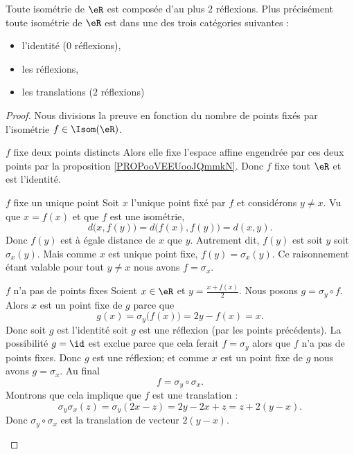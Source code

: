 \begin{theorem}
    Toute isométrie de \( \eR\) est composée d'au plus \( 2\) réflexions. Plus précisément toute isométrie de \( \eR\) est dans une des trois catégories suivantes :
    \begin{itemize}
        \item l'identité (\( 0\) réflexions),
        \item les réflexions,
        \item les translations (\( 2\) réflexions)
    \end{itemize}
\end{theorem}

\begin{proof}
    Nous divisions la preuve en fonction du nombre de points fixés par l'isométrie \( f\in\Isom(\eR)\).
    \begin{subproof}
        \item[\( f\) fixe deux points distincts]
            Alors elle fixe l'espace affine engendrée par ces deux points par la proposition \ref{PROPooVEEUooJQmmkN}. Donc \( f\) fixe tout \( \eR\) et est l'identité.
        \item[\( f\) fixe un unique point]
            Soit \( x\) l'unique point fixé par \( f\) et considérons \( y\neq x\). Vu que \( x=f(x)\) et que \( f\) est une isométrie,
            \begin{equation}
                d\big( x,f(y) \big)=d\big( f(x),f(y) \big)=d(x,y).
            \end{equation}
            Donc \( f(y)\) est à égale distance de \( x\) que \( y\). Autrement dit, \( f(y)\) est soit \( y\) soit \( \sigma_x(y)\). Mais comme \( x\) est unique point fixe, \( f(y)=\sigma_x(y)\). Ce raisonnement étant valable pour tout \( y\neq x  \) nous avons \( f=\sigma_x\).
        \item[\( f\) n'a pas de points fixes]
            Soient \( x\in \eR\) et \( y=\frac{ x+f(x) }{ 2 }\). Nous posons \( g=\sigma_y\circ f\). Alors \( x\) est un point fixe de \( g\) parce que
            \begin{equation}
                g(x)=\sigma_y\big( f(x) \big)=2y-f(x)=x.
            \end{equation}
            Donc soit \( g\) est l'identité soit \( g\) est une réflexion (par les points précédents). La possibilité \( g=\id\) est exclue parce que cela ferait \( f=\sigma_y\) alors que \( f\) n'a pas de points fixes. Donc \( g\) est une réflexion; et comme \( x\) est un point fixe de \( g\) nous avons \( g=\sigma_x\). Au final
            \begin{equation}
                f=\sigma_y\circ\sigma_x.
            \end{equation}
            Montrons que cela implique que \( f\) est une translation :
            \begin{equation}
                \sigma_y\sigma_x(z)=\sigma_y(2x-z)=2y-2x+z=z+2(y-x).
            \end{equation}
            Donc \( \sigma_y\circ\sigma_x\) est la translation de vecteur \( 2(y-x)\).
    \end{subproof}
\end{proof}


